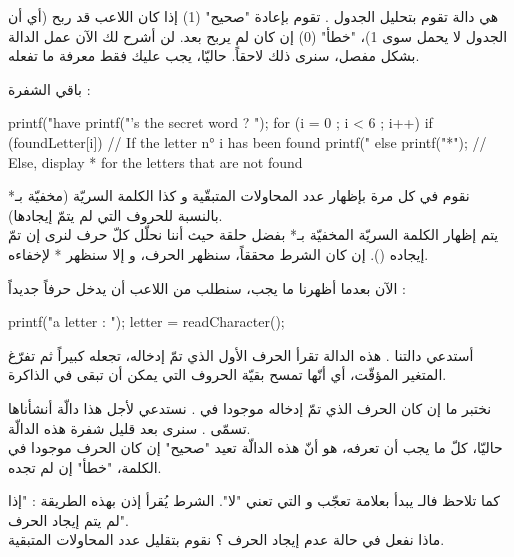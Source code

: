 هي دالة تقوم بتحليل الجدول
.
تقوم بإعادة "صحيح" (1) إذا كان اللاعب قد ربح (أي أن الجدول
لا يحمل سوى 1)، "خطأ" (0) إن كان لم يربح بعد.
لن أشرح لك الآن عمل الدالة بشكل مفصل، سنرى ذلك لاحقاً. حاليّا، يجب عليك فقط معرفة ما تفعله.

باقي الشفرة :

\begin{Csource}
printf("\n\nYou have %
printf("\nWhat's the secret word ? ");
for (i = 0 ; i < 6 ; i++)
{
  if (foundLetter[i]) // If the letter n° i has been found
    printf("%
  else
    printf("*"); // Else, display * for the letters that are not found
}
\end{Csource}

نقوم في كل مرة بإظهار عدد المحاولات المتبقّية و كذا الكلمة السريّة (مخفيّة بـ* بالنسبة للحروف التي لم يتمّ إيجادها).\\
يتم إظهار الكلمة السريّة المخفيّة بـ* بفضل حلقة
حيث أننا نحلّل كلّ حرف لنرى إن تمّ إيجاده
().
إن كان الشرط محققاً، سنظهر الحرف، و إلا سنظهر * لإخفاءه.

الآن بعدما أظهرنا ما يجب، سنطلب من اللاعب أن يدخل حرفاً جديداً :

\begin{Csource}
printf("\nSuggest a letter : ");
letter = readCharacter();
\end{Csource}

أستدعي دالتنا
.
هذه الدالة تقرأ الحرف الأول الذي تمّ إدخاله، تجعله  كبيراً ثم تفرّغ المتغير المؤقّت، أي أنّها تمسح بقيّة الحروف التي يمكن أن تبقى في الذاكرة.

\begin{Csource}
// if it's NOT the right letter
if (!findLetter(letter, secretWord, foundLetter))
  {
    remainingTries--; // Decrement the remaining tries
  }
}
\end{Csource}

نختبر ما إن كان الحرف الذي تمّ إدخاله موجودا في
.
نستدعي لأجل هذا دالّة أنشأناها تسمّى
.
سنرى بعد قليل شفرة هذه الدالّة.\\
حاليّا، كلّ ما يجب أن تعرفه، هو أنّ هذه الدالّة تعيد "صحيح" إن كان الحرف موجودا في الكلمة، "خطأ" إن لم تجده.

كما تلاحظ فالـ
يبدأ بعلامة تعجّب
\InlineCode{!}
و التي تعني "لا". الشرط يُقرأ إذن بهذه الطريقة : "إذا لم يتم إيجاد الحرف".\\
ماذا نفعل في حالة عدم إيجاد الحرف ؟ نقوم بتقليل عدد المحاولات المتبقية.

